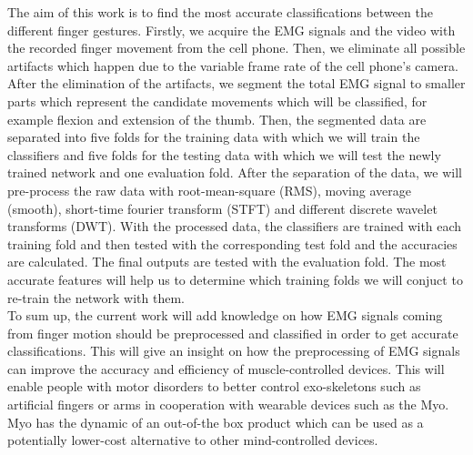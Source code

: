 The aim of this work is to find the most accurate classifications between the different finger gestures. Firstly, we acquire the EMG signals and the video with the recorded finger movement from the cell phone. Then, we eliminate all possible artifacts which happen due to the variable frame rate of the cell phone's camera. After the elimination of the artifacts, we segment the total EMG signal to smaller parts which represent the candidate movements which will be classified, for example flexion and extension of the thumb. Then, the segmented data are separated into five folds for the training data with which we will train the classifiers and five folds for the testing data with which we will test the newly trained network and one evaluation fold. After the separation of the data, we will pre-process the raw data with root-mean-square (RMS), moving average (smooth), short-time fourier transform (STFT) and different discrete wavelet transforms (DWT). With the processed data, the classifiers are trained with each training fold and then tested with the corresponding test fold and the accuracies are calculated. The final outputs are tested with the evaluation fold. The most accurate features will help us to determine which training folds we will conjuct to re-train the network with them. \\
To sum up, the current work will add knowledge on how EMG signals coming from finger motion should be preprocessed and classified in order to get accurate classifications. This will give an insight on how the preprocessing of EMG signals can improve the accuracy and efficiency of muscle-controlled devices. This will enable people with motor disorders to better control exo-skeletons such as artificial fingers or arms in cooperation with wearable devices such as the Myo. Myo has the dynamic of an out-of-the box product which can be used as a potentially lower-cost alternative to other mind-controlled devices.\\

